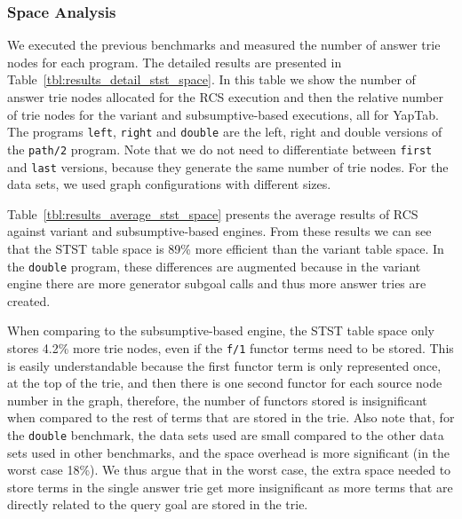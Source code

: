 

\subsubsection{Space Analysis}

We executed the previous benchmarks and measured the number of answer trie nodes for each program.
The detailed results are presented in Table~\ref{tbl:results_detail_stst_space}. In this table
we show the number of answer trie nodes allocated for the RCS execution and then the relative number
of trie nodes for the variant and subsumptive-based executions, all for YapTab.
The programs \texttt{left}, \texttt{right} and \texttt{double} are the left, right and double versions
of the \texttt{path/2} program. Note that we do not need to differentiate between \texttt{first} and
\texttt{last} versions, because they generate the same number of trie nodes. For the data sets, we used
graph configurations with different sizes.

Table~\ref{tbl:results_average_stst_space} presents the average results of RCS against variant and
subsumptive-based engines. From these results we can see that the STST table space is 89\% more efficient
than the variant table space. In the \texttt{double} program, these differences are augmented because in the
variant engine there are more generator subgoal calls and thus more answer tries are created.

When comparing to the subsumptive-based engine, the STST table space only stores 4.2\% more trie nodes,
even if the \texttt{f/1} functor terms need to be stored. This is easily understandable because
the first functor term is only represented once, at the top of the trie, and then there is one second functor
for each source node number in the graph, therefore, the number of functors stored is insignificant when
compared to the rest of terms that are stored in the trie. Also note that, for the \texttt{double} benchmark,
the data sets used are small compared to the other data sets used in other benchmarks, and the space overhead
is more significant (in the worst case 18\%). We thus argue that in the worst case,
the extra space needed to store terms in the single answer trie get more insignificant as more terms
that are directly related to the query goal are stored in the trie.

